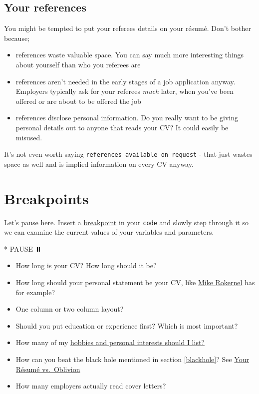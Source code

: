 \documentclass[
]{book}
\newenvironment{Shaded}{\begin{snugshade}}{\end{snugshade}}
\newcommand{\NormalTok}[1]{#1}
\newcommand{\SpecialStringTok}[1]{\textcolor[rgb]{0.31,0.60,0.02}{#1}}
\providecommand{\tightlist}{%
  \setlength{\itemsep}{0pt}\setlength{\parskip}{0pt}}
\begin{document}
\hypertarget{referees}{%
\subsection{Your references}\label{referees}}

You might be tempted to put your referees details on your résumé. Don't bother because;

\begin{itemize}
\tightlist
\item
  references waste valuable space. You can say much more interesting things about yourself than who you referees are
\item
  references aren't needed in the early stages of a job application anyway. Employers typically ask for your referees \emph{much} later, when you've been offered or are about to be offered the job
\item
  references disclose personal information. Do you really want to be giving personal details out to anyone that reads your CV? It could easily be misused.
\end{itemize}

It's not even worth saying \texttt{references\ available\ on\ request} - that just wastes space as well and is implied information on every CV anyway.

\hypertarget{bp7}{%
\section{Breakpoints}\label{bp7}}

Let's pause here. Insert a \href{https://en.wikipedia.org/wiki/Breakpoint}{breakpoint} in your \texttt{code} and slowly step through it so we can examine the current values of your variables and parameters.

\begin{Shaded}
\begin{Highlighting}[]
\SpecialStringTok{* }\NormalTok{PAUSE ⏸️}
\end{Highlighting}
\end{Shaded}

\begin{itemize}
\tightlist
\item
  How long is your CV? How long should it be?
\item
  How long should your personal statement be your CV, like \href{https://www.cdyf.me/Mike_Rokernel.pdf}{Mike Rokernel} has for example?
\item
  One column or two column layout?
\item
  Should you put education or experience first? Which is most important?
\item
  How many of my \href{https://www.reed.co.uk/career-advice/hobbies-and-interests-should-i-include-them-in-my-cv}{hobbies and personal interests should I list?} \citep{hobbies}
\item
  How can you beat the black hole mentioned in section \ref{blackhole}? See \href{https://www.wsj.com/articles/SB10001424052970204624204577178941034941330}{Your Résumé vs.~Oblivion} \citep{oblivion}
\item
  How many employers actually read cover letters?
\end{itemize}
\end{document}
